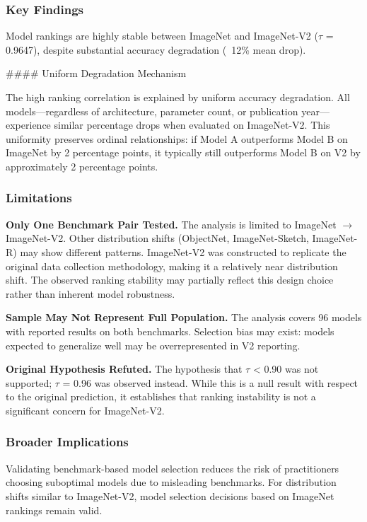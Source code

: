 
\subsubsection{Key Findings}

Model rankings are highly stable between ImageNet and ImageNet-V2 ($\tau$ = 0.9647), despite substantial accuracy degradation (~12\% mean drop).

\#\#\#\# Uniform Degradation Mechanism

The high ranking correlation is explained by uniform accuracy degradation. All models---regardless of architecture, parameter count, or publication year---experience similar percentage drops when evaluated on ImageNet-V2. This uniformity preserves ordinal relationships: if Model A outperforms Model B on ImageNet by 2 percentage points, it typically still outperforms Model B on V2 by approximately 2 percentage points.

\subsubsection{Limitations}

\textbf{Only One Benchmark Pair Tested.} The analysis is limited to ImageNet $\rightarrow$ ImageNet-V2. Other distribution shifts (ObjectNet, ImageNet-Sketch, ImageNet-R) may show different patterns. ImageNet-V2 was constructed to replicate the original data collection methodology, making it a relatively near distribution shift. The observed ranking stability may partially reflect this design choice rather than inherent model robustness.

\textbf{Sample May Not Represent Full Population.} The analysis covers 96 models with reported results on both benchmarks. Selection bias may exist: models expected to generalize well may be overrepresented in V2 reporting.

\textbf{Original Hypothesis Refuted.} The hypothesis that $\tau$ < 0.90 was not supported; $\tau$ = 0.96 was observed instead. While this is a null result with respect to the original prediction, it establishes that ranking instability is not a significant concern for ImageNet-V2.

\subsubsection{Broader Implications}

Validating benchmark-based model selection reduces the risk of practitioners choosing suboptimal models due to misleading benchmarks. For distribution shifts similar to ImageNet-V2, model selection decisions based on ImageNet rankings remain valid.

